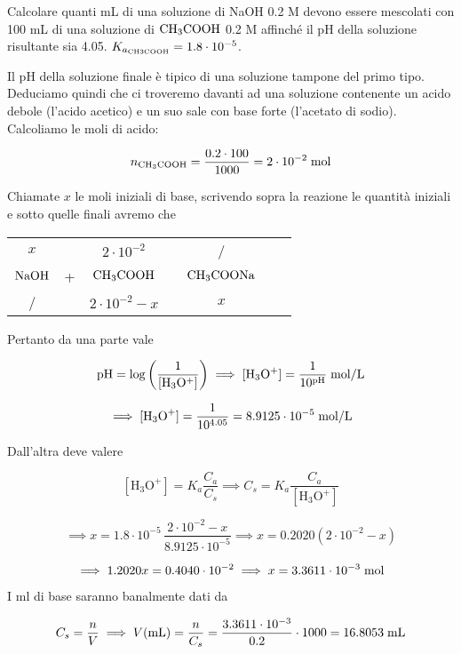 \newpage

\begin{esercizio}
    Calcolare quanti mL di una soluzione di NaOH 0.2 M devono essere mescolati con 100 mL di una soluzione di $\rm CH_3COOH$ 0.2 M affinché il pH della soluzione risultante sia 4.05. $K_{a_{\rm CH3COOH}}=1.8 \cdot 10^{-5}$.
\end{esercizio}
\begin{soluzione}
    Il pH della soluzione finale è tipico di una soluzione tampone del primo tipo. Deduciamo quindi che ci troveremo davanti ad una soluzione contenente un acido debole (l'acido acetico) e un suo sale con base forte (l'acetato di sodio). Calcoliamo le moli di acido:

$$n_{\rm CH_3COOH}=\frac{0.2 \cdot 100}{1000}=2 \cdot 10^{-2} \; \rm mol$$

Chiamate $x$ le moli iniziali di base, scrivendo sopra la reazione le quantità iniziali e sotto quelle finali avremo che

\begin{center}
    \begin{tabular}{ccccccc}
        $x$ & & $2 \cdot 10^{-2}$ & & /\\
        $\rm NaOH$ & + & $\rm CH_3COOH$ & \ce{<-->} & $\rm CH_3COONa$\\
        / & & $2 \cdot 10^{-2} - x$ & & $x$\\
    \end{tabular}
\end{center}

Pertanto da una parte vale

$$\rm pH=\log{\left(\frac{1}{[H_3O^+]}\right)}
\implies
[H_3O^+]=\frac{1}{10^{pH}} \; \rm mol/L$$

$$\implies
[\text{H}_3\text{O}^+]=\frac{1}{10^{4.05}}=8.9125 \cdot 10^{-5} \; \rm mol/L$$

Dall'altra deve valere

$$[\text{H}_3\text{O}^+]=K_a\frac{C_a}{C_s}
\implies
C_s=K_a\frac{C_a}{[\text{H}_3\text{O}^+]}$$

$$\implies
x=1.8 \cdot 10^{-5}\,\frac{2 \cdot 10^{-2} - x}{8.9125 \cdot 10^{-5}}
\implies
x=0.2020(2 \cdot 10^{-2} - x)$$

$$\implies
1.2020 x = 0.4040 \cdot 10^{-2}
\implies x=3.3611 \cdot 10^{-3} \; \rm mol$$

I ml di base saranno banalmente dati da

$$C_s=\frac{n}{V}
\implies
V(\text{mL})=\frac{n}{C_s}
=\frac{3.3611 \cdot 10^{-3}}{0.2} \cdot 1000
=16.8053 \; \rm mL$$

\end{soluzione}

